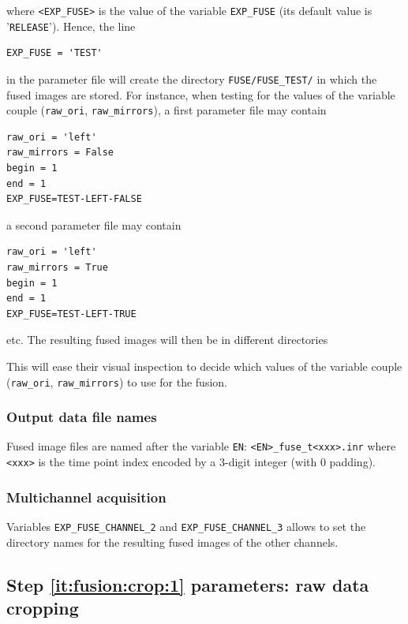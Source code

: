 \mbox{}
\mbox{}

where \texttt{<EXP\_FUSE>} is the value of the variable \texttt{EXP\_FUSE} (its
default value is '\texttt{RELEASE}'). Hence, the line
\begin{verbatim}
EXP_FUSE = 'TEST'
\end{verbatim}
in the parameter file will create the directory
\texttt{FUSE/FUSE\_TEST/} in which the fused images are stored. For
instance, when testing for the values of the variable couple
(\texttt{raw\_ori}, \texttt{raw\_mirrors}), a first parameter file may
contain
\begin{verbatim}
raw_ori = 'left'
raw_mirrors = False
begin = 1
end = 1
EXP_FUSE=TEST-LEFT-FALSE
\end{verbatim}
a second parameter file may
contain
\begin{verbatim}
raw_ori = 'left'
raw_mirrors = True
begin = 1
end = 1
EXP_FUSE=TEST-LEFT-TRUE
\end{verbatim}
etc. The resulting fused images will then be in different directories

\mbox{}
\mbox{}

This will ease their visual inspection to decide which values of the variable couple
(\texttt{raw\_ori}, \texttt{raw\_mirrors}) to use for the fusion.

\subsubsection{Output data file names}

Fused image files are named after the variable \texttt{EN}:
\texttt{<EN>\_fuse\_t<xxx>.inr} where \texttt{<xxx>} is the time point
index encoded by a 3-digit integer (with 0 padding).


\subsubsection{Multichannel acquisition}

Variables \texttt{EXP\_FUSE\_CHANNEL\_2} and
\texttt{EXP\_FUSE\_CHANNEL\_3} allows to set the directory names for
the resulting fused images of the other channels.

\subsection{Step \ref{it:fusion:crop:1} parameters: raw data cropping}
\label{sec:cli:fuse:raw:data:cropping}

